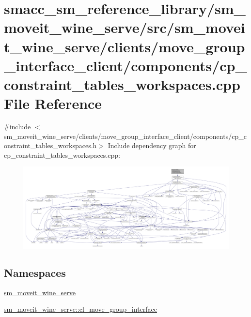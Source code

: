 \hypertarget{sm__moveit__wine__serve_2src_2sm__moveit__wine__serve_2clients_2move__group__interface__client_2da875f836e48ab6be3b616254307d8ee}{}\section{smacc\+\_\+sm\+\_\+reference\+\_\+library/sm\+\_\+moveit\+\_\+wine\+\_\+serve/src/sm\+\_\+moveit\+\_\+wine\+\_\+serve/clients/move\+\_\+group\+\_\+interface\+\_\+client/components/cp\+\_\+constraint\+\_\+tables\+\_\+workspaces.cpp File Reference}
\label{sm__moveit__wine__serve_2src_2sm__moveit__wine__serve_2clients_2move__group__interface__client_2da875f836e48ab6be3b616254307d8ee}
{\ttfamily \#include $<$sm\+\_\+moveit\+\_\+wine\+\_\+serve/clients/move\+\_\+group\+\_\+interface\+\_\+client/components/cp\+\_\+constraint\+\_\+tables\+\_\+workspaces.\+h$>$}\newline
Include dependency graph for cp\+\_\+constraint\+\_\+tables\+\_\+workspaces.\+cpp\+:
\nopagebreak
\begin{figure}[H]
\begin{center}
\leavevmode
\includegraphics[width=350pt]{sm__moveit__wine__serve_2src_2sm__moveit__wine__serve_2clients_2move__group__interface__client_22808b40b013974712220d9060f28d038}
\end{center}
\end{figure}
\subsection*{Namespaces}
\begin{DoxyCompactItemize}
\item 
 \hyperlink{namespacesm__moveit__wine__serve}{sm\+\_\+moveit\+\_\+wine\+\_\+serve}
\item 
 \hyperlink{namespacesm__moveit__wine__serve_1_1cl__move__group__interface}{sm\+\_\+moveit\+\_\+wine\+\_\+serve\+::cl\+\_\+move\+\_\+group\+\_\+interface}
\end{DoxyCompactItemize}
